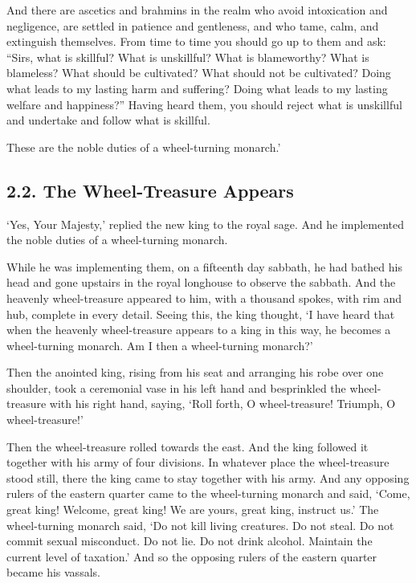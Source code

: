 \documentclass[12pt,openany]{book}%
\begin{document}
And there are ascetics and brahmins in the realm who avoid intoxication and negligence, are settled in patience and gentleness, and who tame, calm, and extinguish themselves. From time to time you should go up to them and ask: “Sirs, what is skillful? What is unskillful? What is blameworthy? What is blameless? What should be cultivated? What should not be cultivated? Doing what leads to my lasting harm and suffering? Doing what leads to my lasting welfare and happiness?” Having heard them, you should reject what is unskillful and undertake and follow what is skillful. 

These are the noble duties of a wheel-turning monarch.’ 

\subsection*{2.2. The Wheel-Treasure Appears }

‘Yes, Your Majesty,’ replied the new king to the royal sage. And he implemented the noble duties of a wheel-turning monarch. 

While he was implementing them, on a fifteenth day sabbath, he had bathed his head and gone upstairs in the royal longhouse to observe the sabbath. And the heavenly wheel-treasure appeared to him, with a thousand spokes, with rim and hub, complete in every detail. Seeing this, the king thought, ‘I have heard that when the heavenly wheel-treasure appears to a king in this way, he becomes a wheel-turning monarch. Am I then a wheel-turning monarch?’ 

Then the anointed king, rising from his seat and arranging his robe over one shoulder, took a ceremonial vase in his left hand and besprinkled the wheel-treasure with his right hand, saying, ‘Roll forth, O wheel-treasure! Triumph, O wheel-treasure!’ 

Then the wheel-treasure rolled towards the east. And the king followed it together with his army of four divisions. In whatever place the wheel-treasure stood still, there the king came to stay together with his army. And any opposing rulers of the eastern quarter came to the wheel-turning monarch and said, ‘Come, great king! Welcome, great king! We are yours, great king, instruct us.’ The wheel-turning monarch said, ‘Do not kill living creatures. Do not steal. Do not commit sexual misconduct. Do not lie. Do not drink alcohol. Maintain the current level of taxation.’ And so the opposing rulers of the eastern quarter became his vassals. 
\end{document}
